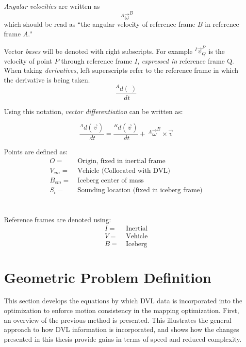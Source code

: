 \emph{Angular velocities} are written as 
\begin{equation*}
 ~^{A}\vec{\omega}^{B}
\end{equation*}
which should be read as ``the angular velocity of reference frame $B$ in reference frame $A$."

Vector \emph{bases} will be denoted with right subscripts. For example $^I\vec{v}^P_{Q}$ is the velocity of point $P$ through reference frame $I$, \emph{expressed in} reference frame Q.   
When taking \emph{derivatives}, left superscripts refer to the reference frame in which the derivative is being taken.
\begin{equation*}
 \frac{^{A}d(~)}{~dt}
\end{equation*}

Using this notation, \emph{vector differentiation} can be written as:

\begin{equation*}
 \frac{^{A}d(\vec{v})}{~dt} = \frac{^{B}d(\vec{v})}{~dt} + ~^{A}\vec{\omega}^{B}\times \vec{v}
\end{equation*}

Points are defined as:
\begin{align*}
O =&~ \text{Origin, fixed in inertial frame}\\
V_{cm} =&~ \text{Vehicle (Collocated with DVL)} \\
B_{cm} =&~ \text{Iceberg center of mass}\\
S_i =&~ \text{Sounding location (fixed in iceberg frame)}
\end{align*}
\\
\\
Reference frames are denoted using:
\begin{align*}
I =&~ \text{Inertial}\\
V =&~ \text{Vehicle} \\
B =&~ \text{Iceberg}
\end{align*}


\section{Geometric Problem Definition}

This section develops the equations by which DVL data is incorporated into the optimization to enforce motion consistency in the mapping optimization. First, an overview of the previous method is presented. This illustrates the general approach to how DVL information is incorporated, and shows how the changes presented in this thesis provide gains in terms of speed and reduced complexity.

